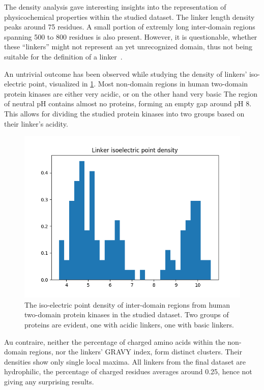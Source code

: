 \label{res}

\label{res:dens}

	The density analysis gave interesting insights into the representation of
	physicochemical properties within the studied dataset.
	The linker length density peaks around 75 residues.
	A small portion of extremly long inter-domain regions spanning 500 to 800 residues is
	also present.
	However, it is questionable, whether these ``linkers'' might not represent an yet
	unrecognized domain, thus not being suitable for the definition of a
	linker~\cite{milano2016structural}.

	An untrivial outcome has been observed while studying the density of linkers'
	iso-electric point, visualized in \cref{fig:iso-dens}.
	Most non-domain regions in human two-domain protein kinases are either very acidic, or
	on the other hand very basic
	The region of neutral pH contains almost no proteins, forming an empty gap around pH 8.
	This allows for dividing the studied protein kinases into two groups based on their
	linker's acidity.

	\begin{figure}
		\centering
		\includegraphics[width=.9\linewidth]{img/iso_density.png}
		\caption{The iso-electric point density of inter-domain regions from human two-domain
		protein kinases in the studied dataset. Two groups of proteins are evident, one with
		acidic linkers, one with basic linkers.}
		\label{fig:iso-dens}
	\end{figure}

	Au contraire, neither the percentage of charged amino acids within the non-domain
	regions, nor the linkers' GRAVY index, form distinct clusters.
	Their densities show only single local maxima.
	All linkers from the final dataset are hydrophilic, the percentage of charged residues
	averages around 0.25, hence not giving any surprising results.

